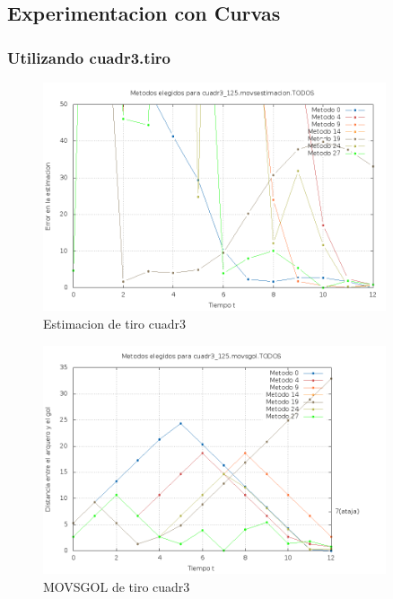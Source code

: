 \subsection{Experimentacion con Curvas}

\subsubsection{Utilizando cuadr3.tiro}

\begin{figure}[H]
\begin{center}
\includegraphics[width=0.9\textwidth]{img/cuadr3_125_movsestimacion_TODOS_elegidos.png}
     \caption{Estimacion de tiro cuadr3}
\end{center}
\end{figure}

\begin{figure}[H]
\begin{center}
\includegraphics[width=0.9\textwidth]{img/cuadr3_125_movsgol_TODOS_elegidos.png}
     \caption{MOVSGOL de tiro cuadr3}
\end{center}
\end{figure}


